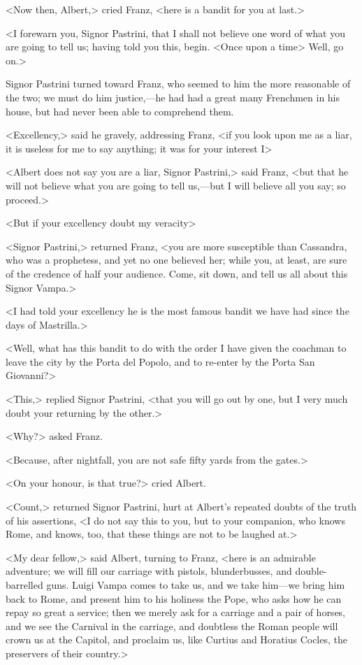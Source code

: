  <Now then, Albert,> cried Franz, <here is a bandit for you at last.> 

 <I forewarn you, Signor Pastrini, that I shall not believe one word of what you are going to tell us; having told you this, begin. <Once upon a time\longdash> Well, go on.> 

 Signor Pastrini turned toward Franz, who seemed to him the more reasonable of the two; we must do him justice,—he had had a great many Frenchmen in his house, but had never been able to comprehend them. 

 <Excellency,> said he gravely, addressing Franz, <if you look upon me as a liar, it is useless for me to say anything; it was for your interest I\longdash> 

 <Albert does not say you are a liar, Signor Pastrini,> said Franz, <but that he will not believe what you are going to tell us,—but I will believe all you say; so proceed.> 

 <But if your excellency doubt my veracity\longdash> 

 <Signor Pastrini,> returned Franz, <you are more susceptible than Cassandra, who was a prophetess, and yet no one believed her; while you, at least, are sure of the credence of half your audience. Come, sit down, and tell us all about this Signor Vampa.> 

 <I had told your excellency he is the most famous bandit we have had since the days of Mastrilla.> 

 <Well, what has this bandit to do with the order I have given the coachman to leave the city by the Porta del Popolo, and to re-enter by the Porta San Giovanni?>

<This,> replied Signor Pastrini, <that you will go out by one, but I very much doubt your returning by the other.> 

 <Why?> asked Franz. 

 <Because, after nightfall, you are not safe fifty yards from the gates.> 

 <On your honour, is that true?> cried Albert. 

 <Count,> returned Signor Pastrini, hurt at Albert's repeated doubts of the truth of his assertions, <I do not say this to you, but to your companion, who knows Rome, and knows, too, that these things are not to be laughed at.> 

 <My dear fellow,> said Albert, turning to Franz, <here is an admirable adventure; we will fill our carriage with pistols, blunderbusses, and double-barrelled guns. Luigi Vampa comes to take us, and we take him—we bring him back to Rome, and present him to his holiness the Pope, who asks how he can repay so great a service; then we merely ask for a carriage and a pair of horses, and we see the Carnival in the carriage, and doubtless the Roman people will crown us at the Capitol, and proclaim us, like Curtius and Horatius Cocles, the preservers of their country.> 


